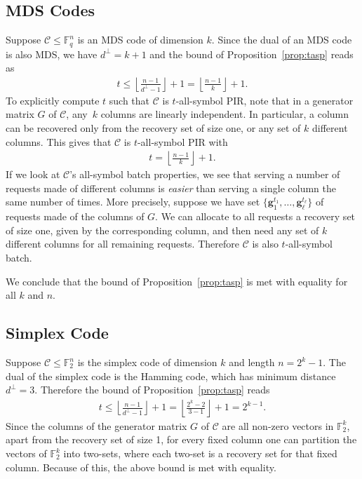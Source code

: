 \documentclass[11pt,a4paper]{article}
\theoremstyle{definition}
\newcommand{\bfg}{{\boldsymbol g}}
\newcommand{\F}{\mathbb{F}}
\newcommand{\mC}{\mathcal{C}}
\begin{document}
\subsection{MDS Codes}
Suppose $\mC \le \F_q^n$ is an MDS code of dimension $k$. Since the dual of an MDS code is also MDS, we have $d^\perp=k+1$ and the bound of Proposition~\ref{prop:tasp} reads as
\begin{align*}
    t \le \left\lfloor\frac{n-1}{d^\perp-1}\right\rfloor+1=\left\lfloor\frac{n-1}{k}\right\rfloor+1.
\end{align*}
To explicitly compute $t$ such that $\mC$ is $t$-all-symbol PIR, note that in a generator matrix $G$ of $\mC$, any~$k$ columns are linearly independent. In particular, a column can be recovered only from the recovery set of size one, or any set of $k$ different columns. This gives that $\mC$ is $t$-all-symbol PIR with
\begin{align*}
    t=\left\lfloor\frac{n-1}{k} \right\rfloor+1.
\end{align*}
If we look at $\mC$'s all-symbol batch properties, we see that serving a number of requests made of different columns is \textit{easier} than serving a single column the same number of times. More precisely, suppose we have set $\{\bfg_1^{t_1},\dots,\bfg_{\ell}^{t_{\ell}}\}$ of requests made of the columns of $G$. We can allocate to all requests a recovery set of size one, given by the corresponding column, and then need any set of $k$ different columns for all remaining requests. Therefore $\mC$ is also $t$-all-symbol batch. 

We conclude that the bound of Proposition~\ref{prop:tasp} is met with equality for all $k$ and $n$.

\subsection{Simplex Code}
Suppose $\mC \le \F_2^n$ is the simplex code of dimension $k$ and length $n=2^k-1$. The dual of the simplex code is the Hamming code, which has minimum distance $d^{\perp}=3$. Therefore the bound of Proposition~\ref{prop:tasp} reads
\begin{align*}
    t \le \left\lfloor\frac{n-1}{d^\perp-1}\right\rfloor+1=\left\lfloor\frac{2^k-2}{3-1}\right\rfloor+1=2^{k-1}.
\end{align*}
Since the columns of the generator matrix $G$ of $\mC$ are all non-zero vectors in $\F_2^k$, apart from the recovery set of size 1, for every fixed column one can partition the vectors of $\F_2^k$ into two-sets, where each two-set is a recovery set for that fixed column. Because of this, the above bound is met with equality. 
\end{document}
